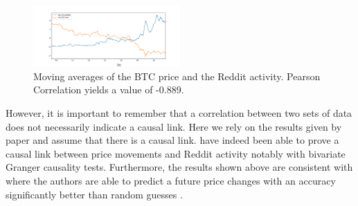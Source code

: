 \begin{figure}[H]
    \centering
    \includegraphics[width=0.5\textwidth]{figures/corr_pearson_0.pdf}
    \caption{Moving averages of the BTC price and the Reddit activity. Pearson Correlation yields a value of -0.889.}
\end{figure}


However, it is important to remember that a correlation between two sets of data does not necessarily indicate a causal link. Here we rely on the results given by paper  and assume that there is a causal link. \citeauthor{wooleyExtractingCryptocurrencyPrice2019} have indeed been able to prove a causal link between price movements and Reddit activity notably with bivariate Granger causality tests. Furthermore, the results shown above are consistent with  where the authors are able to predict a future price changes with an accuracy significantly better than random guesses \cite{iderCryptocurrencyReturnPrediction2022}.




